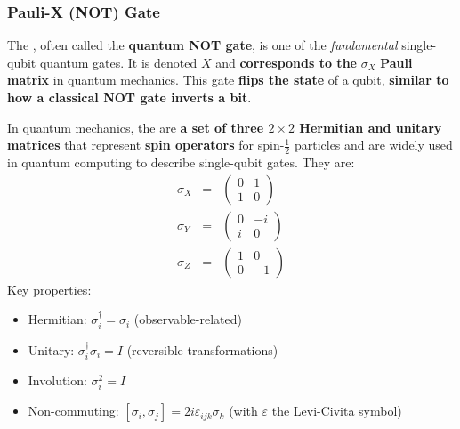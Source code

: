 \subsubsection{Pauli-X (NOT) Gate}\label{subsubsection: Pauli-X NOT Gate}

The , often called the \textbf{quantum NOT gate}, is one of the \emph{fundamental} single-qubit quantum gates. It is denoted $X$ and \textbf{corresponds to the} $\sigma_{X}$ \textbf{Pauli matrix} in quantum mechanics. This gate \textbf{flips the state} of a qubit, \textbf{similar to how a classical NOT gate inverts a bit}.

\highspace
\begin{remarkbox}
   In quantum mechanics, the  are \textbf{a set of three $2 \times 2$ Hermitian and unitary matrices} that represent \textbf{spin operators} for spin-$\frac{1}{2}$ particles and are widely used in quantum computing to describe single-qubit gates. They are:
   \begin{equation*}
      \begin{array}{rcl}
         \sigma_{X} &=&
         \begin{pmatrix}
            0 & 1 \\
            1 & 0
         \end{pmatrix} \\ [1em]
         \sigma_{Y} &=&
         \begin{pmatrix}
            0 & -i \\
            i & 0
         \end{pmatrix} \\ [1em]
         \sigma_{Z} &=&
         \begin{pmatrix}
            1 & 0 \\
            0 & -1
         \end{pmatrix}
      \end{array}
   \end{equation*}
   Key properties:
   \begin{itemize}
      \item Hermitian: $\sigma_{i}^{\dagger} = \sigma_{i}$ (observable-related)
      \item Unitary: $\sigma_{i}^{\dagger} \sigma_{i} = I$ (reversible transformations)
      \item Involution: $\sigma_{i}^{2} = I$
      \item Non-commuting: $\left[\sigma_{i}, \sigma_{j}\right] = 2i \varepsilon_{ijk} \sigma_{k}$ (with $\varepsilon$ the Levi-Civita symbol)
   \end{itemize}
\end{remarkbox}

